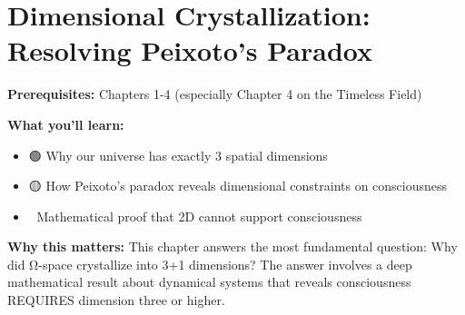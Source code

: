 \chapter{Dimensional Crystallization: Resolving Peixoto's Paradox}
\label{ch:peixoto}

\begin{chapterobjectives}
\textbf{Prerequisites:} Chapters 1-4 (especially Chapter 4 on the Timeless Field)

\textbf{What you'll learn:}
\begin{itemize}
\item 🟢 Why our universe has exactly 3 spatial dimensions
\item 🟡 How Peixoto's paradox reveals dimensional constraints on consciousness
\item 🔴 Mathematical proof that 2D cannot support consciousness
\end{itemize}

\textbf{Why this matters:} This chapter answers the most fundamental question: Why did Ω-space crystallize into 3+1 dimensions? The answer involves a deep mathematical result about dynamical systems that reveals consciousness REQUIRES dimension three or higher.
\end{chapterobjectives}

